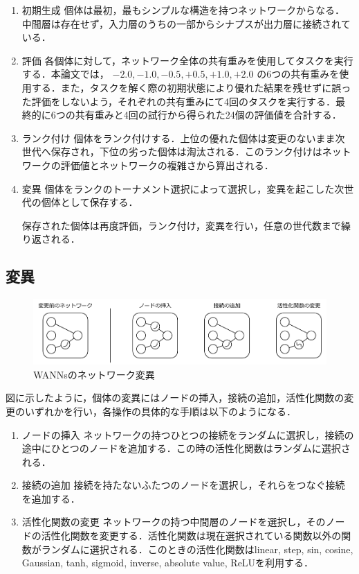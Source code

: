 \begin{enumerate}
    \item 初期生成
    個体は最初，最もシンプルな構造を持つネットワークからなる．中間層は存在せず，入力層のうちの一部からシナプスが出力層に接続されている．

    \item 評価
    各個体に対して，ネットワーク全体の共有重みを使用してタスクを実行する．本論文では， $ -2.0, -1.0, -0.5, +0.5, +1.0, +2.0 $ の6つの共有重みを使用する．また，タスクを解く際の初期状態により優れた結果を残せずに誤った評価をしないよう，それぞれの共有重みにて4回のタスクを実行する．最終的に6つの共有重みと4回の試行から得られた24個の評価値を合計する．

    \item ランク付け
    個体をランク付けする．上位の優れた個体は変更のないまま次世代へ保存され，下位の劣った個体は淘汰される．このランク付けはネットワークの評価値とネットワークの複雑さから算出される．

    \item 変異
    個体をランクのトーナメント選択\cite{遺伝的アルゴリズム}によって選択し，変異を起こした次世代の個体として保存する．

    保存された個体は再度評価，ランク付け，変異を行い，任意の世代数まで繰り返される．
\end{enumerate}

\subsection{変異}

\begin{figure}[h]
    \begin{center}
        \includegraphics[scale=0.8]{img/vary.pdf}
        \caption{WANNsのネットワーク変異}
    \end{center}
\end{figure}

図に示したように，個体の変異にはノードの挿入，接続の追加，活性化関数の変更のいずれかを行い，各操作の具体的な手順は以下のようになる．

\begin{enumerate}
    \item ノードの挿入
    ネットワークの持つひとつの接続をランダムに選択し，接続の途中にひとつのノードを追加する．この時の活性化関数はランダムに選択される．

    \item 接続の追加
    接続を持たないふたつのノードを選択し，それらをつなぐ接続を追加する．

    \item 活性化関数の変更
    ネットワークの持つ中間層のノードを選択し，そのノードの活性化関数を変更する．活性化関数は現在選択されている関数以外の関数がランダムに選択される．このときの活性化関数はlinear, step, sin, cosine, Gaussian, tanh, sigmoid, inverse, absolute value, ReLUを利用する．
\end{enumerate}